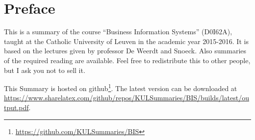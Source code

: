 \section*{Preface}
This is a summary of the course ``Business Information Systems'' (D0I62A), taught at the Catholic University of Leuven in the academic year 2015-2016. It is based on the lectures given by professor De Weerdt and Snoeck. Also summaries of the required reading are available. Feel free to redistribute this to other people, but I ask you not to sell it.

This Summary is hosted on github\footnote{\url{https://github.com/KULSummaries/BIS}}. The latest version can be downloaded at \url{https://www.sharelatex.com/github/repos/KULSummaries/BIS/builds/latest/output.pdf}.
